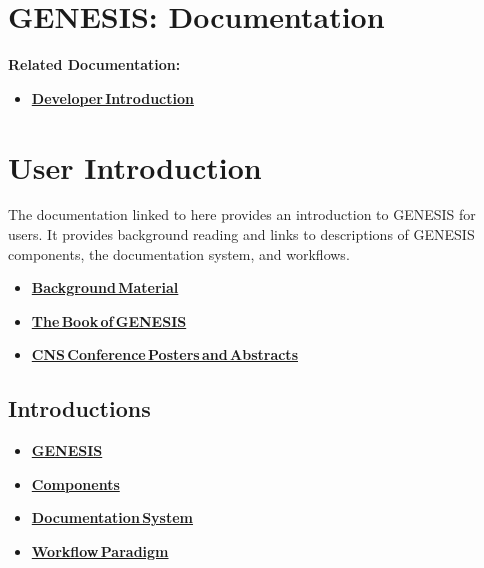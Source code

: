 \documentclass[12pt]{article}
\begin{document}
\section*{GENESIS: Documentation}

{\bf Related Documentation:}
\begin{itemize}
   \item[]\href{../developer-intro/developer-intro.tex}{\bf Developer\,Introduction}
\end{itemize}

\section*{User Introduction}

The documentation linked to here provides an introduction to GENESIS for users. It provides background reading and links to descriptions of GENESIS components, the documentation system, and workflows.
\begin{itemize}
   \item[]\href{../background-material/background-material.tex}{\bf Background\,Material}
   \item[]\href{../book-of-genesis/book-of-genesis.tex}{\bf The\,Book\,of\,GENESIS}
   \item[]\href{../cns/cns.tex}{\bf CNS\,Conference\,Posters\,and\,Abstracts}
\end{itemize}

\subsection*{Introductions}
\begin{itemize}
   \item[]\href{../genesis-intro/genesis-intro.tex}{\bf GENESIS}
   \item[]\href{../genesis-components/genesis-components.tex}{\bf Components}
   \item[]\href{../documentation-overview/documentation-overview.tex}{\bf Documentation\,System}
   \item[]\href{../workflow-intro/workflow-intro.tex}{\bf Workflow\,Paradigm}
\end{itemize}
\end{document}
